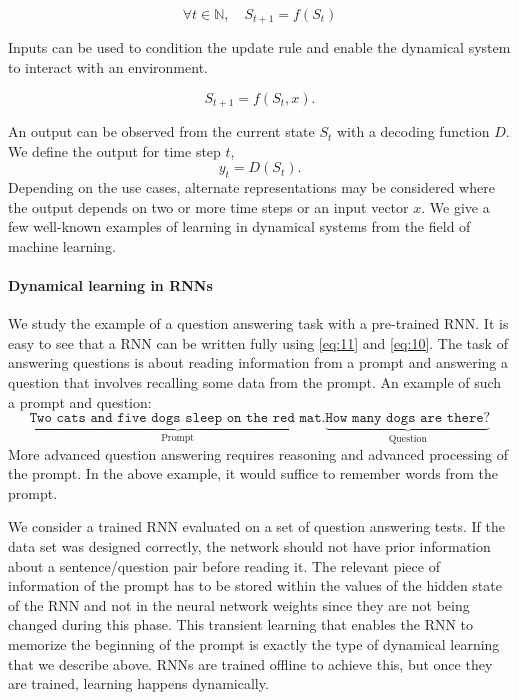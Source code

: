 \begin{equation}
  \forall t \in \mathbb{N},\quad S_{t + 1} = f(S_{t})
  \label{eq:dyn-update}
\end{equation}

Inputs can be used to condition the update rule and enable the dynamical system
to interact with an environment.

\begin{equation}
S_{t+1} = f(S_t, x).
\label{eq:11}
\end{equation}

An output can be observed from the current state $S_t$ with a decoding function
$D$. We define the output for time step $t$,
\begin{equation}
  \label{eq:10}
  y_t = D(S_t).
\end{equation}
Depending on the use cases, alternate representations may be considered where
the output depends on two or more time steps or an input vector $x$.
We give a few well-known examples of learning in dynamical systems from the
field of machine learning.

\paragraph{Dynamical learning in \acp{RNN}}\label{sec:dynam-learn-acprnn}
We study the example of a question answering task with a pre-trained \ac{RNN}.
It is easy to see that a \ac{RNN} can be written fully using \eqref{eq:11} and
\eqref{eq:10}. The task of answering questions is about reading information from
a prompt and answering a question that involves recalling some data from the
prompt. An example of such a prompt and question:
\begin{equation*}
  \underbrace{\texttt{Two cats and five dogs sleep on the red mat.}}_{\text{Prompt}}
  \underbrace{\texttt{How many dogs are there?}}_{\text{Question}}
\end{equation*}
More advanced question answering requires reasoning and advanced processing of
the prompt. In the above example, it would suffice to remember words from the
prompt.

We consider a trained \ac{RNN} evaluated on a set of question answering tests.
If the data set was designed correctly, the network should not have prior
information about a sentence/question pair before reading it. The relevant piece
of information of the prompt has to be stored within the values of the hidden
state of the \ac{RNN} and not in the neural network weights since they are not
being changed during this phase. This transient learning that enables the
\ac{RNN} to memorize the beginning of the prompt is exactly the type of
dynamical learning that we describe above. \acp{RNN} are trained offline to
achieve this, but once they are trained, learning happens dynamically.

